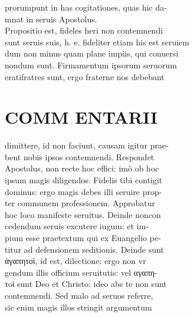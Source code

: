 \documentclass{article}
\begin{document}
\begin{pages}
                prorumpunt in has cogitationes, quas hic da- \\
                mnat in seruis Apostolus. \\
                Propositio est, fideles heri non contemnendi \\
                sunt seruis suis, h. e. fideliter etiam his est seruiem \\
                dum non minus quam plane impiis, qui conuersi \\
                nondum sunt. Firmamentum ipsorum seruorum \\
                eratifratres sunt, ergo fraterne nos debebant \\
                
\section*{COMM ENTARII \\
                }dimittere, id non faciunt, causam igitur prae- \\
                bent nobis ipsos contemnendi. Respondet \\
                Apostolus, non recte hoc effici: imò ob hoc \\
                ipsum magis diligendos. Fidelis tibi contigit \\
                dominus: ergo magis debes illi seruire prop- \\
                ter communem professionem. Approbatur \\
                hoc loco manifeste seruitus. Deinde noncon \\
                cedendum seruis excutere iugum: et im- \\
                pium esse praetextum qui ex Euangelio pe- \\
                titur ad defensionem seditionis. Deinde sunt \\
                ἀγαπητοὶ, id est, dilectione: ergo non vr \\
                gendum illis officium seruitutis: vel αγαπη- \\
                τoὶ sunt Deo et Christo: ideo abs te non sunt \\
                contemnendi. Sed malo ad seruos referre, \\
                sic enim magis illos stringit argumentum \\

\end{pages}
\end{document}
